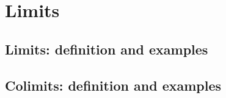 \chapter{Limits}



\section{Limits: definition and examples}
\addtocounter{subsection}{32}













\section{Colimits: definition and examples}
\addtocounter{subsection}{20}





